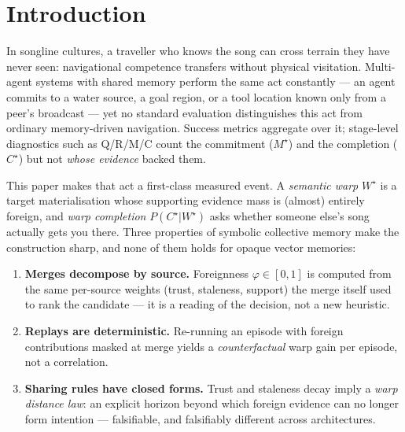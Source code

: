 \documentclass{article}
\newcommand{\wstar}{W^{\star}}
\newcommand{\mstar}{M^{\star}}
\newcommand{\cstar}{C^{\star}}
\begin{document}
\section{Introduction}
\label{sec:intro}

In songline cultures, a traveller who knows the song can cross terrain
they have never seen: navigational competence transfers without
physical visitation. Multi-agent systems with shared memory perform
the same act constantly --- an agent commits to a water source, a goal
region, or a tool location known only from a peer's broadcast --- yet
no standard evaluation distinguishes this act from ordinary
memory-driven navigation. Success metrics aggregate over it;
stage-level diagnostics such as Q/R/M/C count the commitment
($\mstar$) and the completion ($\cstar$) but not \emph{whose evidence}
backed them.

This paper makes that act a first-class measured event. A
\emph{semantic warp} $\wstar$ is a target materialisation whose
supporting evidence mass is (almost) entirely foreign, and
\emph{warp completion} $P(\cstar|\wstar)$ asks whether someone else's
song actually gets you there. Three properties of symbolic collective
memory make the construction sharp, and none of them holds for opaque
vector memories:

\begin{enumerate}[leftmargin=20pt,itemsep=2pt,topsep=2pt]
\item \textbf{Merges decompose by source.} Foreignness
  $\varphi\in[0,1]$ is computed from the same per-source weights
  (trust, staleness, support) the merge itself used to rank the
  candidate --- it is a reading of the decision, not a new heuristic.
\item \textbf{Replays are deterministic.} Re-running an episode with
  foreign contributions masked at merge yields a \emph{counterfactual}
  warp gain per episode, not a correlation.
\item \textbf{Sharing rules have closed forms.} Trust and staleness
  decay imply a \emph{warp distance law}: an explicit horizon beyond
  which foreign evidence can no longer form intention --- falsifiable,
  and falsifiably different across architectures.
\end{enumerate}
\end{document}
